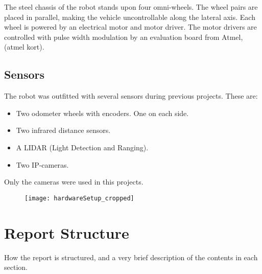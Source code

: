 The steel chassis of the robot stands upon four omni-wheels. The wheel pairs are placed in parallel, making the vehicle uncontrollable along the lateral axis. Each wheel is powered by an electrical motor and motor driver. The motor drivers are controlled with pulse width modulation by an evaluation board from Atmel,(atmel kort).  

\subsection{Sensors}

The robot was outfitted with several sensors during previous projects. These are:
\begin{itemize}
	\item Two odometer wheels with encoders. One on each side. 
	\item Two infrared distance sensors. 
	\item A LIDAR (Light Detection and Ranging).
	\item Two IP-cameras.
\end{itemize} 

Only the cameras were used in this projects. 

\begin{figure}
	\texttt{[image: hardwareSetup\_cropped]}
\end{figure}

\section{Report Structure}
How the report is structured, and a very brief description of the contents in each section.